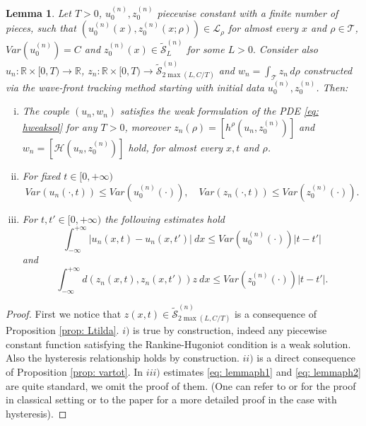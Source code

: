 \documentclass[12pt]{article}
\newcommand{\R}{\mathbb{R}}
\newcommand{\HM}{\mathcal{H}}
\newcommand{\LL}{\mathcal{L}}
\newcommand{\T}{\mathcal{T}}
\newcommand{\p}{\rho}
\newcommand{\RH}{Rankine-Hugoniot }
\newcommand{\1}{\mathds{1}}
\newtheorem{lem}[teo]{Lemma}
\theoremstyle{definition}
\begin{document}
\begin{lem}\label{lemma: ph1} 
    Let $T>0$, $u_0^{(n)},z_0^{(n)}$ piecewise constant with a finite number of pieces, such that $(u_0^{(n)}(x),z_0^{(n)}(x;\p))\in\LL_\p$ for almost every $x$ and $\p\in \T$, $Var(u_0^{(n)})=C$ and $z_0^{(n)}(x)\in \tilde{\mathcal S}_L^{(n)}$ for some $L>0.$ Consider also $u_n: \R \times [0,T)\to \R $,   $z_n: \R \times [0,T)\to \tilde{\mathcal S}_{2\max(L,C/T)}^{(n)} $ and $w_n= \int_\T z_n \, d\p$ constructed via the wave-front tracking method starting with initial data $u_0^{(n)},z_0^{(n)}$. Then: \begin{enumerate}[i)]
    \item The couple $(u_n,w_n)$ satisfies the weak formulation of the PDE \eqref{eq: hweaksol} for any $T>0$, moreover $z_n(\p) =[h^\p(u_n,z_0^{(n)})]$ and $w_n=[\HM(u_n,z_0^{(n)})]$ hold, for almost every $x,t$ and $\p$.
    \item For fixed $t\in [0,+\infty)$ \begin{equation}\label{eq: lemmaph0}
        Var(u_n(\cdot,t))\leq Var (u_0^{(n)}(\cdot)), \quad Var(z_n(\cdot,t))\leq Var(z_0^{(n)}(\cdot)).
    \end{equation} 
    \item For $t,t'\in [0,+\infty)$ the following estimates hold \begin{equation}\label{eq: lemmaph1}
        \int_{-\infty}^{+\infty} |u_n(x,t)-u_n(x,t')|~dx \leq Var(u_0^{(n)}(\cdot))|t-t'|
    \end{equation} and \begin{equation}\label{eq: lemmaph2}
        \int_{-\infty}^{+\infty} d(z_n(x,t),z_n(x,t'))z~dx \leq Var(z^{(n)}_0(\cdot))|t-t'|.
    \end{equation}
\end{enumerate}
\end{lem}
\begin{proof}
    First we notice that $z(x,t)\in \tilde{\mathcal S}_{2\max(L,C/T)}^{(n)}$ is a consequence of Proposition \ref{prop: Ltilda}.
    $i)$ is true by construction, indeed any piecewise constant function satisfying the \RH condition is a weak solution. Also the hysteresis relationship holds by construction. $ii)$ is a direct consequence of Proposition \ref{prop: vartot}. In $iii)$ estimates \eqref{eq: lemmaph1} and \eqref{eq: lemmaph2} are quite standard, we omit the proof of them. (One can refer to \cite{AB3} or \cite{HH} for the proof in classical setting or to the paper \cite{BFMS} for a more detailed proof in the case with hysteresis).
\end{proof}
\end{document}

